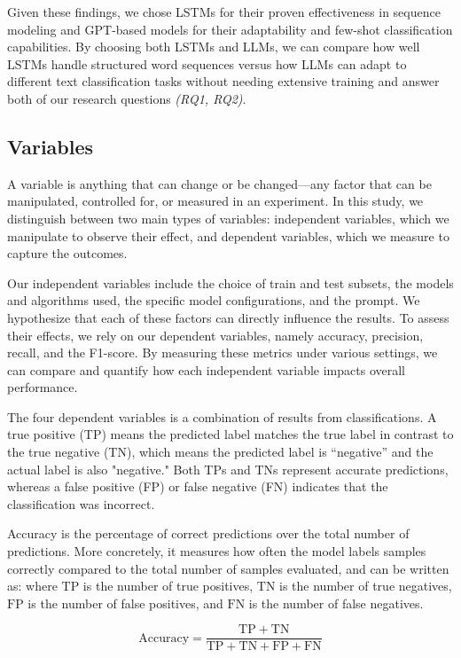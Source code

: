 Given these findings, we chose LSTMs for their proven effectiveness in sequence modeling and GPT-based models for their adaptability and few-shot classification capabilities. By choosing both LSTMs and LLMs, we can compare how well LSTMs handle structured word sequences versus how LLMs can adapt to different text classification tasks without needing extensive training and answer both of our research questions \textit{(RQ1, RQ2)}.

\subsection{Variables}
A variable is anything that can change or be changed—any factor that can be manipulated, controlled for, or measured in an experiment. In this study, we distinguish between two main types of variables: independent variables, which we manipulate to observe their effect, and dependent variables, which we measure to capture the outcomes.

Our independent variables include the choice of train and test subsets, the models and algorithms used, the specific model configurations, and the prompt. We hypothesize that each of these factors can directly influence the results. To assess their effects, we rely on our dependent variables, namely accuracy, precision, recall, and the F1-score. By measuring these metrics under various settings, we can compare and quantify how each independent variable impacts overall performance.

The four dependent variables is a combination of results from classifications.  A true positive (TP) means the predicted label matches the true label in contrast  to the true negative (TN), which means the predicted label is “negative” and the  actual label is also "negative." Both TPs and TNs represent accurate predictions,  whereas a false positive (FP) or false negative (FN) indicates that the  classification was incorrect.

\medskip
Accuracy is the percentage of correct predictions over the total number of  predictions. More concretely, it measures how often the model labels samples  correctly compared to the total number of samples evaluated, and can be written  as: where $\mathrm{TP}$ is the number of true positives, $\mathrm{TN}$ is the  number of true negatives, $\mathrm{FP}$ is the number of false positives,  and $\mathrm{FN}$ is the number of false negatives.

$$
\mathrm{Accuracy} = \frac{\mathrm{TP} + \mathrm{TN}}
{\mathrm{TP} + \mathrm{TN} + \mathrm{FP} + \mathrm{FN}}
$$

